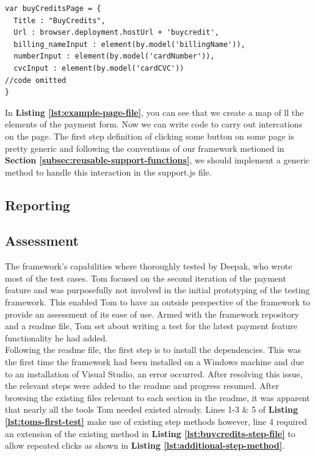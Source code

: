 \begin{listing}[H]
\begin{verbatim}
var buyCreditsPage = {
  Title : "BuyCredits",
  Url : browser.deployment.hostUrl + 'buycredit',
  billing_nameInput : element(by.model('billingName')),
  numberInput : element(by.model('cardNumber')),
  cvcInput : element(by.model('cardCVC'))
//code omitted
}
\end{verbatim}
\label{lst:example-page-file}
\end{listing}

In \textbf{Listing \ref{lst:example-page-file}}, you can see that we create a map of ll the elements of the payment form. Now we can write code to carry out intercations on the page. The first step definition of clicking some button on some page is pretty generic and following the conventions of our framework metioned in \textbf{Section \ref{subsec:reusable-support-functions}}, we should implement a generic method to handle this interaction in the support.js file.

\subsection{Reporting}
\label{subsec:reporting}

\subsection{Assessment}
\label{subsec:assessment}

The framework's capabilities where thoroughly tested by Deepak, who wrote most of the test cases. Tom focused on the second iteration of the payment feature and was purposefully not involved in the initial prototyping of the testing framework. This enabled Tom to have an outside perspective of the framework to provide an assessment of its ease of use. Armed with the framework repository and a readme file, Tom set about writing a test for the latest payment feature functionality he had added.\\ 

Following the readme file, the first step is to install the dependencies. This was the first time the framework had been installed on a Windows machine and due to an installation of Visual Studio, an error occurred. After resolving this issue, the relevant steps were added to the readme and progress resumed. After browsing the existing files relevant to each section in the readme, it was apparent that nearly all the tools Tom needed existed already. Lines 1-3 \& 5 of \textbf{Listing \ref{lst:toms-first-test}} make use of existing step methods however, line 4 required an extension of the existing method in \textbf{Listing \ref{lst:buycredits-step-file}} to allow repeated clicks as shown in \textbf{Listing \ref{lst:additional-step-method}}.\\

